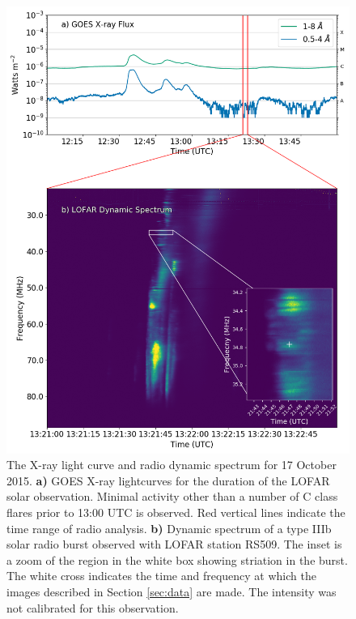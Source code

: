 \begin{figure}
    \centering
    \includegraphics[width=\columnwidth]{Images/Burst_inset_goes_20200730.png}
    \caption[GOES X-ray lightcurves and dynamic spectrum for the duration of a LOFAR solar observation 17 October 2015.]{The X-ray light curve and radio dynamic spectrum for 17 October 2015. \textbf{a)} GOES X-ray lightcurves for the duration of the LOFAR solar observation. Minimal activity other than a number of C class flares prior to 13:00 UTC is observed. Red vertical lines indicate the time range of radio analysis. \textbf{b)} Dynamic spectrum of a type IIIb solar radio burst observed with LOFAR station RS509. The inset is a zoom of the region in the white box showing striation in the burst. The white cross indicates the time and frequency at which the images described in Section \ref{sec:data} are made. The intensity was not calibrated for this observation.}
    \label{fig:context}
\end{figure}

